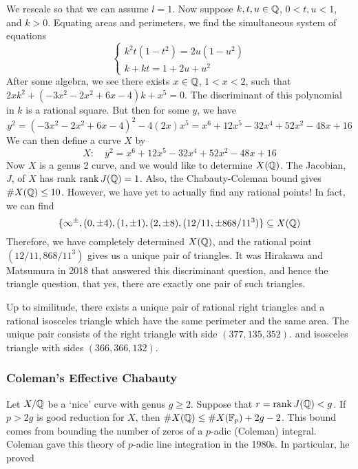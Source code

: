 We rescale so that we can assume $l=1$. Now suppose $k,t,u \in \mathbb{Q}$, $0<t,u<1$, and $k>0$. Equating areas and perimeters, we find the simultaneous system of equations 
	\[
	\begin{cases}
	k^2 t (1 - t^2)= 2u (1 - u^2) \\
	k + kt= 1 + 2u + u^2 
	\end{cases}
	\]
After some algebra, we see there exists $x \in \mathbb{Q}$, $1<x<2$, such that $2xk^2+(-3x^2 - 2x^2 + 6x - 4)k + x^5= 0$. The discriminant of this polynomial in $k$ is a rational square. But then for some $y$, we have
	\[
	y^2= (-3x^2 - 2x^2 + 6x - 4)^2 - 4(2x)x^5= x^6 + 12x^5 - 32x^4 + 52x^2 - 48x + 16
	\]
We can then define a curve $X$ by
	\[
	X \colon \quad y^2= x^6 + 12x^5 - 32x^4 + 52x^2 - 48x + 16
	\]
Now $X$ is a genus 2 curve, and we would like to determine $X(\mathbb{Q})$. The Jacobian, $J$, of $X$ has rank $\operatorname{rank} J(\mathbb{Q})=1$. Also, the Chabauty-Coleman bound gives $\#X(\mathbb{Q}) \leq 10$. However, we have yet to actually find any rational points! In fact, we can find 
	\[
	\{\infty^\pm, (0,\pm 4), (1,\pm 1), (2, \pm 8), (12/11,\pm 868/11^3) \} \subseteq X(\mathbb{Q})
	\]
Therefore, we have completely determined $X(\mathbb{Q})$, and the rational point $(12/11,868/11^3)$ gives us a unique pair of triangles. It was Hirakawa and Matsumura in 2018 that answered this discriminant question, and hence the triangle question, that yes, there are exactly one pair of such triangles.


\begin{thm}
Up to similitude, there exists a unique pair of rational right triangles and a rational isosceles triangle which have the same perimeter and the same area. The unique pair consists of the right triangle with side $(377,135,352)$. and isosceles triangle with sides $(366,366,132)$. 
\end{thm}



\subsubsection{Coleman's Effective Chabauty}

Let $X/\mathbb{Q}$ be a `nice' curve with genus $g \geq 2$. Suppose that $r= \operatorname{rank} J(\mathbb{Q}) < g$. If $p>2g$ is good reduction for $X$, then $\#X(\mathbb{Q}) \leq \#X(\mathbb{F}_p) + 2g - 2$. This bound comes from bounding the number of zeros of a $p$-adic (Coleman) integral. Coleman gave this theory of $p$-adic line integration in the 1980s. In particular, he proved 


